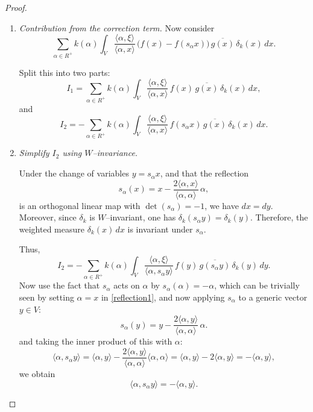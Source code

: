 \documentclass[12pt]{article}
\newcommand{\1}{\mathbbm{1}}
\theoremstyle{definition}
\begin{document}
\begin{proof}
\begin{enumerate}
\item \textsl{Contribution from the correction term.}  
Now consider
\[
  \sum_{\alpha \in R^+} k(\alpha)\int_V
    \frac{\langle \alpha,\xi\rangle}{\langle \alpha,x\rangle}\,
      \big( f(x) - f(s_\alpha x)\big)\,
      \overline{g(x)}\,\delta_k(x)\,dx.
\]

Split this into two parts:
\[
  I_1 = \sum_{\alpha \in R^+} k(\alpha)\int_V
    \frac{\langle \alpha,\xi\rangle}{\langle \alpha,x\rangle}\,
      f(x)\,\overline{g(x)}\,\delta_k(x)\,dx,
\]
and
\[
  I_2 = -\sum_{\alpha \in R^+} k(\alpha)\int_V
    \frac{\langle \alpha,\xi\rangle}{\langle \alpha,x\rangle}\,
      f(s_\alpha x)\,\overline{g(x)}\,\delta_k(x)\,dx.
\]

\medskip

\noindent
\item \textsl{Simplify $I_2$ using $W$--invariance.}  

Under the change of variables $y = s_\alpha x$, and that the reflection 
\begin{equation}\label{reflection1}
s_{\alpha}(x) = x - \frac{2\langle \alpha, x \rangle}{\langle \alpha, \alpha \rangle}\,\alpha,
\end{equation}
is an orthogonal linear map with $\det(s_\alpha) = -1$, we have $dx = dy$. Moreover,
since $\delta_k$ is $W$--invariant, one has $\delta_k(s_\alpha y) = \delta_k(y)$.
Therefore, the weighted measure $\delta_k(x)\,dx$ is invariant under $s_\alpha$.


Thus,
\begin{equation}\label{integral2}
I_2 = -\sum_{\alpha \in R^+} k(\alpha)\int_V
    \frac{\langle \alpha,\xi\rangle}{\langle \alpha,s_\alpha y\rangle}\,
      f(y)\,\overline{g(s_\alpha y)}\,\delta_k(y)\,dy.
\end{equation}
\noindent
Now use the fact that $s_\alpha$ acts on $\alpha$ by $s_\alpha(\alpha) = -\alpha$, which can be trivially seen by setting $\alpha=x$ in \eqref{reflection1}, and now applying $s_\alpha$ to a generic vector $y \in V$:
\[
s_\alpha(y) = y - \frac{2\langle \alpha, y \rangle}{\langle \alpha, \alpha \rangle}\,\alpha.
\]
and taking the inner product of this with $\alpha$:
\[
\langle \alpha, s_\alpha y \rangle
= \langle \alpha, y \rangle
  - \frac{2\langle \alpha, y \rangle}{\langle \alpha, \alpha \rangle}\langle \alpha, \alpha \rangle
= \langle \alpha, y \rangle - 2\langle \alpha, y \rangle
= -\langle \alpha, y \rangle,
\]
we obtain
\[
\langle \alpha, s_\alpha y \rangle = -\langle \alpha, y \rangle.
\]




\end{enumerate}
\end{proof}
\end{document}
